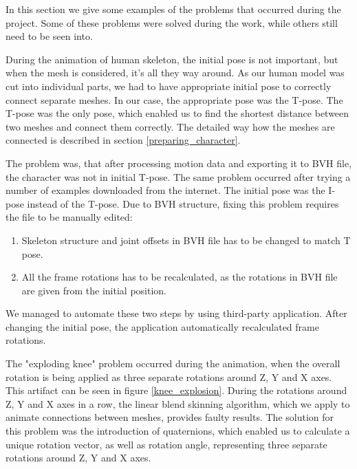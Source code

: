 \documentclass[times, 10pt,twocolumn]{article}
\begin{document}

In this section we give some examples of the problems that occurred during the project.
Some of these problems were solved during the work, while others still need to be seen into.


During the animation of human skeleton, the initial pose is not important, but when the mesh is considered,
it's all they way around. As our human model was cut into individual parts,
we had to have appropriate initial pose to correctly connect separate meshes. In our case, the appropriate pose was the T-pose. The T-pose was the only pose, which enabled us to find the shortest distance between two meshes and connect them correctly. The detailed way how the meshes are connected is described in section \ref{preparing_character}.

The problem was, that after processing motion data and exporting it to BVH file, the character was not in initial T-pose.
The same problem occurred after trying a number of examples downloaded from the internet. The initial pose was the I-pose instead of the T-pose.
Due to BVH structure, fixing this problem requires the file to be manually edited:

\begin{enumerate}
\item Skeleton structure and joint offsets in BVH file has to be changed to match T pose.
\item All the frame rotations has to be recalculated, as the rotations in BVH file are given from the initial position.
\end{enumerate}

We managed to automate these two steps by using third-party application. After changing the initial pose, the application automatically recalculated frame rotations.


The "exploding knee" problem occurred during the animation, when the overall rotation is being applied as three separate rotations around Z, Y and X axes. This artifact can be seen in figure \ref{knee_explosion}.
During the rotations around Z, Y and X axes in a row, the linear blend skinning algorithm, which we apply to animate connections between meshes, provides faulty results. The solution for this problem was the introduction of quaternions, which enabled us to calculate a unique rotation vector, as well as rotation angle, representing three separate rotations around Z, Y and X axes.
\end{document}

